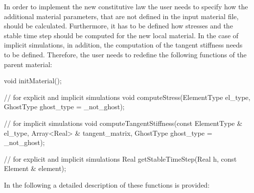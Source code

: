 In order to implement the new constitutive law the user needs to
specify how the additional material parameters, that are not
defined in the input material file, should be calculated. Furthermore,
it has to be defined how stresses and the stable time step should be
computed for the new local material. In the case of implicit
simulations, in addition, the computation of the tangent stiffness needs
to be defined. Therefore, the user needs to redefine the following
functions of the parent material:
\begin{cpp}
void initMaterial();

// for explicit and implicit simulations void
computeStress(ElementType el_type, GhostType ghost_type = _not_ghost);

// for implicit simulations
void computeTangentStiffness(const ElementType & el_type,
                             Array<Real> & tangent_matrix,
                             GhostType ghost_type = _not_ghost);

// for explicit and implicit simulations
Real getStableTimeStep(Real h, const Element & element);
\end{cpp}
In the following a detailed description of these functions is provided:
